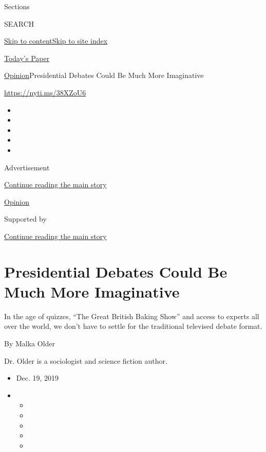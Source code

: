 Sections

SEARCH

\protect\hyperlink{site-content}{Skip to
content}\protect\hyperlink{site-index}{Skip to site index}

\href{https://myaccount.nytimes.com/auth/login?response_type=cookie\&client_id=vi}{}

\href{https://www.nytimes.com/section/todayspaper}{Today's Paper}

\href{/section/opinion}{Opinion}\textbar{}Presidential Debates Could Be
Much More Imaginative

\url{https://nyti.ms/38XZoU6}

\begin{itemize}
\item
\item
\item
\item
\item
\end{itemize}

Advertisement

\protect\hyperlink{after-top}{Continue reading the main story}

\href{/section/opinion}{Opinion}

Supported by

\protect\hyperlink{after-sponsor}{Continue reading the main story}

\hypertarget{presidential-debates-could-be-much-more-imaginative}{%
\section{Presidential Debates Could Be Much More
Imaginative}\label{presidential-debates-could-be-much-more-imaginative}}

In the age of quizzes, ``The Great British Baking Show'' and access to
experts all over the world, we don't have to settle for the traditional
televised debate format.

By Malka Older

Dr. Older is a sociologist and science fiction author.

\begin{itemize}
\item
  Dec. 19, 2019
\item
  \begin{itemize}
  \item
  \item
  \item
  \item
  \item
  \end{itemize}
\end{itemize}

